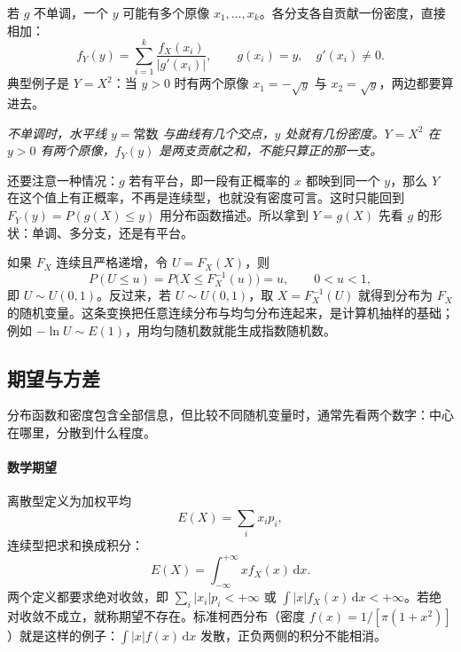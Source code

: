 若 $g$ 不单调，一个 $y$ 可能有多个原像 $x_1,\dots,x_k$。各分支各自贡献一份密度，直接相加：
\[
f_Y(y)=\sum_{i=1}^{k}\frac{f_X(x_i)}{\bigl|g'(x_i)\bigr|},
\qquad g(x_i)=y,\quad g'(x_i)\neq0 .
\]
典型例子是 $Y=X^2$：当 $y>0$ 时有两个原像 $x_1=-\sqrt y$ 与 $x_2=\sqrt y$，两边都要算进去。

\begin{center}
\par\vspace{3pt}
{\footnotesize\itshape 不单调时，水平线 $y=\text{常数}$ 与曲线有几个交点，$y$ 处就有几份密度。$Y=X^2$ 在 $y>0$ 有两个原像，$f_Y(y)$ 是两支贡献之和，不能只算正的那一支。}
\end{center}

还要注意一种情况：$g$ 若有平台，即一段有正概率的 $x$ 都映到同一个 $y$，那么 $Y$ 在这个值上有正概率，不再是连续型，也就没有密度可言。这时只能回到 $F_Y(y)=P(g(X)\le y)$ 用分布函数描述。所以拿到 $Y=g(X)$ 先看 $g$ 的形状：单调、多分支，还是有平台。

如果 $F_X$ 连续且严格递增，令 $U=F_X(X)$，则
\[
P(U\le u)=P\bigl(X\le F_X^{-1}(u)\bigr)=u,\qquad 0<u<1,
\]
即 $U\sim U(0,1)$。反过来，若 $U\sim U(0,1)$，取 $X=F_X^{-1}(U)$ 就得到分布为 $F_X$ 的随机变量。这条变换把任意连续分布与均匀分布连起来，是计算机抽样的基础；例如 $-\ln U\sim E(1)$，用均匀随机数就能生成指数随机数。

\subsection{期望与方差}

分布函数和密度包含全部信息，但比较不同随机变量时，通常先看两个数字：中心在哪里，分散到什么程度。

\paragraph{数学期望} 离散型定义为加权平均
\[
E(X)=\sum_i x_ip_i,
\]
连续型把求和换成积分：
\[
E(X)=\int_{-\infty}^{+\infty}x f_X(x)\,\mathrm dx .
\]
两个定义都要求绝对收敛，即 $\sum_i|x_i|p_i<+\infty$ 或 $\int|x|f_X(x)\,\mathrm dx<+\infty$。若绝对收敛不成立，就称期望不存在。标准柯西分布（密度 $f(x)=1/[\pi(1+x^2)]$）就是这样的例子：$\int|x|f(x)\,\mathrm dx$ 发散，正负两侧的积分不能相消。

